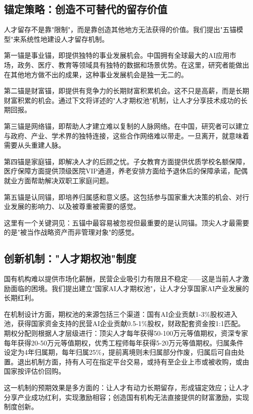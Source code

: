 \subsection{锚定策略：创造不可替代的留存价值}

人才留存不是靠"限制"，而是靠创造其他地方无法获得的价值。我们提出"五锚模型"来系统性地建设人才留存机制。

第一锚是事业锚，即提供独特的事业发展机会。中国拥有全球最大的AI应用市场，政务、医疗、教育等领域具有独特的数据和场景优势。在这里，研究者能做出在其他地方做不出的成果，这种事业发展机会是独一无二的。

第二锚是财富锚，即提供有竞争力的长期财富积累机会。这不只是高薪，而是长期财富积累的机会。通过下文将详述的"人才期权池"机制，让人才分享技术成功的长期回报。

第三锚是网络锚，即帮助人才建立难以复制的人脉网络。在中国，研究者可以建立与政府、产业、学术界的独特连接，这些合作网络难以带走。一旦离开，就意味着需要从头重建人脉。

第四锚是家庭锚，即解决人才的后顾之忧。子女教育方面提供优质学校名额保障，医疗保障方面提供顶级医院VIP通道，养老安排方面给予退休后的保障承诺，配偶就业方面帮助解决双职工家庭问题。

第五锚是认同锚，即培养归属感和意义感。这包括参与国家重大决策的机会、对行业发展的影响力、以及被尊重被需要的感觉。

这里有一个关键洞见：五锚中最容易被忽视但最重要的是认同锚。顶尖人才最需要的是"被当作战略资产而非管理对象"的感觉。

\subsection{创新机制："人才期权池"制度}

国有机构难以提供市场化薪酬，民营企业吸引力有限且不稳定——这是当前人才激励面临的困境。我们提出建立"国家AI人才期权池"，让人才分享国家AI产业发展的长期红利。

在机制设计方面，期权池的来源包括三个渠道：国有AI企业贡献1-3\%股权进入池，获得国家资金支持的民营AI企业贡献0.5-1\%股权，财政配套资金按1:1匹配。期权分配则根据人才层级进行：顶尖人才每年获得50-100万元等值期权，资深专家每年获得20-50万元等值期权，优秀工程师每年获得5-20万元等值期权。归属条件设定为4年归属期，每年归属25\%，提前离境则未归属部分作废，归属后可自由处置。退出机制方面，持有人可在指定平台交易，或持有至企业上市或被收购，或由国家按评估价回购。

这一机制的预期效果是多方面的：让人才有动力长期留存，形成锚定效应；让人才分享产业成功红利，实现激励相容；创造国有机构无法直接提供的财富激励，实现制度创新。

